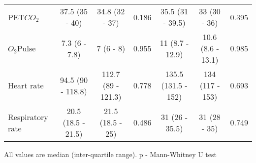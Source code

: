 \begin{sidewaystable}[p]
\begin{tabular}{l | c c c | c c c}
		PET$CO_2$                    & 37.5 (35 - 40)      & 34.8 (32 - 37)     & 0.186 & 35.5 (31 - 39.5)    & 33 (30 - 36)       & 0.395 \\
		$O_2$Pulse                   & 7.3 (6 - 7.8)       & 7 (6 - 8)          & 0.955 & 11 (8.7 - 12.9)     & 10.6 (8.6 - 13.1)  & 0.985 \\
		Heart rate                   & 94.5 (90 - 118.8)   & 112.7 (89 - 121.3) & 0.778 & 135.5 (131.5 - 152) & 134 (117 - 153)    & 0.693 \\
		Respiratory rate             & 20.5 (18.5 - 21.5)  & 21.5 (18.5 - 25)   & 0.486 & 31 (26 - 35.5)      & 31 (28 - 35)       & 0.749 \\ \hline
	\end{tabular}
	
	
	All values are median (inter-quartile range). p - Mann-Whitney U test
\end{sidewaystable}

